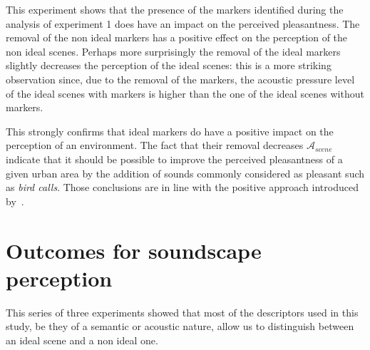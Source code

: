 \documentclass[12pt]{elsarticle}
\begin{document}
This experiment shows that the presence of the markers identified during the analysis of experiment 1 does have an impact on the perceived pleasantness. The removal of the non ideal markers has a positive effect on the perception of the non ideal scenes. Perhaps more surprisingly the removal of the ideal markers slightly decreases the perception of the ideal scenes: this is a more striking observation since, due to the removal of the markers, the acoustic pressure level of the ideal scenes with markers is higher than the one of the ideal scenes without markers.


This strongly confirms that ideal markers do have a positive impact on the perception of an environment. The fact that their removal decreases $\mathcal{A}_{scene}$ indicate that it should be possible to improve the perceived pleasantness of a given urban area by the addition of sounds commonly considered as pleasant such as \emph{bird calls}. Those conclusions are in line with the positive approach introduced by~\cite{schafer1977tuning}.



\section{Outcomes for soundscape perception}
\label{sec:conclusion}

This series of three experiments showed that most of the descriptors used in this study, be they of a semantic or acoustic nature, allow us to distinguish between an ideal scene and a non ideal one.

\end{document}
